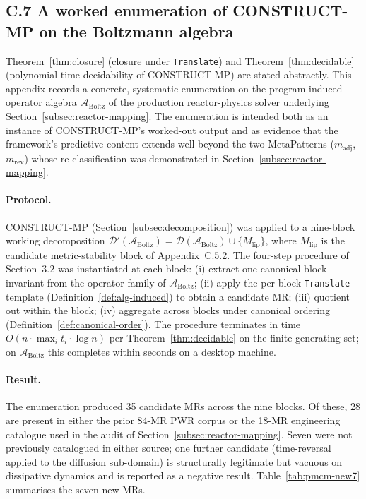 \subsection*{C.7 A worked enumeration of CONSTRUCT-MP on the Boltzmann algebra}
\label{app:pmcm-enumeration}

Theorem~\ref{thm:closure} (closure under \texttt{Translate}) and Theorem~\ref{thm:decidable} (polynomial-time decidability of CONSTRUCT-MP) are stated abstractly. This appendix records a concrete, systematic enumeration on the program-induced operator algebra $\mathcal{A}_{\mathrm{Boltz}}$ of the production reactor-physics solver underlying Section~\ref{subsec:reactor-mapping}. The enumeration is intended both as an instance of CONSTRUCT-MP's worked-out output and as evidence that the framework's predictive content extends well beyond the two MetaPatterns ($m_{\mathrm{adj}}$, $m_{\mathrm{rev}}$) whose re-classification was demonstrated in Section~\ref{subsec:reactor-mapping}.

\paragraph{Protocol.} CONSTRUCT-MP (Section~\ref{subsec:decomposition}) was applied to a nine-block working decomposition $\mathcal{D}'(\mathcal{A}_{\mathrm{Boltz}}) = \mathcal{D}(\mathcal{A}_{\mathrm{Boltz}}) \cup \{ M_{\mathrm{lip}} \}$, where $M_{\mathrm{lip}}$ is the candidate metric-stability block of Appendix~C.5.2. The four-step procedure of Section~3.2 was instantiated at each block: (i) extract one canonical block invariant from the operator family of $\mathcal{A}_{\mathrm{Boltz}}$; (ii) apply the per-block \texttt{Translate} template (Definition~\ref{def:alg-induced}) to obtain a candidate MR; (iii) quotient out within the block; (iv) aggregate across blocks under canonical ordering (Definition~\ref{def:canonical-order}). The procedure terminates in time $O(n \cdot \max_i t_i \cdot \log n)$ per Theorem~\ref{thm:decidable} on the finite generating set; on $\mathcal{A}_{\mathrm{Boltz}}$ this completes within seconds on a desktop machine.

\paragraph{Result.} The enumeration produced 35 candidate MRs across the nine blocks. Of these, 28 are present in either the prior 84-MR PWR corpus or the 18-MR engineering catalogue used in the audit of Section~\ref{subsec:reactor-mapping}. Seven were not previously catalogued in either source; one further candidate (time-reversal applied to the diffusion sub-domain) is structurally legitimate but vacuous on dissipative dynamics and is reported as a negative result. Table~\ref{tab:pmcm-new7} summarises the seven new MRs.

